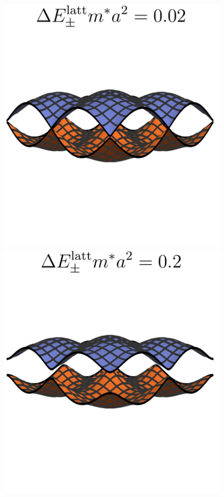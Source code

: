 \documentclass[submission, Phys]{SciPost}
\begin{document}
\begin{figure}[ht]
    \centering
    \includegraphics{fig/lattice_dispersion_3.jpg}
    \includegraphics{fig/lattice_dispersion_2.jpg}

\end{figure}
\end{document}
